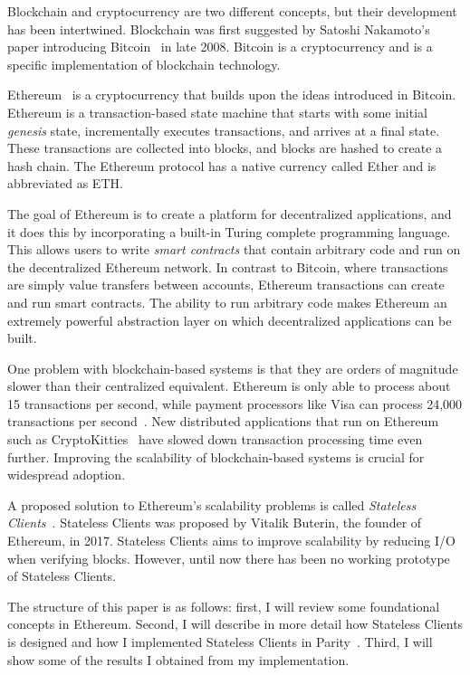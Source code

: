 \documentclass[12pt]{article}
\newcounter{protocol}
\newcommand{\System}{Stateless Clients\xspace}
\begin{document}
Blockchain and cryptocurrency are two different concepts, but their development has been intertwined. Blockchain was first suggested by Satoshi Nakamoto's paper introducing Bitcoin~\cite{bitcoin} in late 2008. Bitcoin is a cryptocurrency and is a specific implementation of blockchain technology.

Ethereum~\cite{ethereum} is a cryptocurrency that builds upon the ideas introduced in Bitcoin. Ethereum is a transaction-based state machine that starts with some initial \emph{genesis} state, incrementally executes transactions, and arrives at a final state. These transactions are collected into blocks, and blocks are hashed to create a hash chain. The Ethereum protocol has a native currency called Ether and is abbreviated as ETH.

The goal of Ethereum is to create a platform for decentralized applications, and it does this by incorporating a built-in Turing complete programming language. This allows users to write \emph{smart contracts} that contain arbitrary code and run on the decentralized Ethereum network. In contrast to Bitcoin, where transactions are simply value transfers between accounts, Ethereum transactions can create and run smart contracts. The ability to run arbitrary code makes Ethereum an extremely powerful abstraction layer on which decentralized applications can be built.

One problem with blockchain-based systems is that they are orders of magnitude slower than their centralized equivalent. Ethereum is only able to process about 15 transactions per second, while payment processors like Visa can process 24,000 transactions per second~\cite{visa}. New distributed applications that run on Ethereum such as CryptoKitties~\cite{cryptokitties} have slowed down transaction processing time even further. Improving the scalability of blockchain-based systems is crucial for widespread adoption.

A proposed solution to Ethereum's scalability problems is called \emph{\System}~\cite{statelessclients}. \System was proposed by Vitalik Buterin, the founder of Ethereum, in 2017. \System aims to improve scalability by reducing I/O when verifying blocks. However, until now there has been no working prototype of \System.

The structure of this paper is as follows: first, I will review some foundational concepts in Ethereum. Second, I will describe in more detail how \System is designed and how I implemented \System in Parity~\cite{parity}. Third, I will show some of the results I obtained from my implementation.
\end{document}
